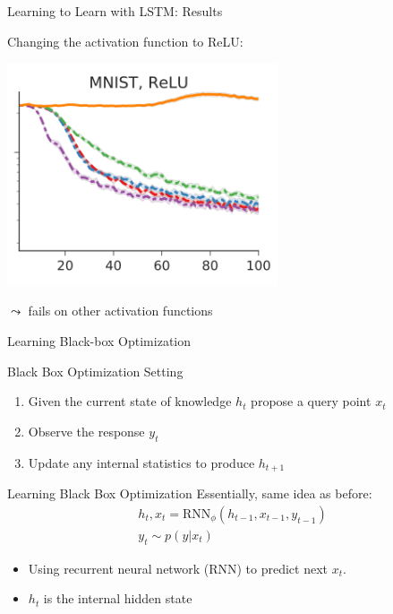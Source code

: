 \begin{frame}[c]{Learning to Learn with LSTM: Results\newline {}}

Changing the activation function to ReLU:
\smallskip

\centering
\includegraphics[width=0.6\textwidth]{images/l2l_mnist_relu}

$\leadsto$ fails on other activation functions

\end{frame}
\begin{frame}[c]{Learning Black-box Optimization~}

\begin{block}{Black Box Optimization Setting}
\begin{enumerate}
  \item Given the current state of knowledge $h_t$ propose a query point $x_t$
  \item Observe the response $y_t$
  \item Update any internal statistics to produce $h_{t+1}$
\end{enumerate}
\end{block}

\pause

\begin{block}{Learning Black Box Optimization}
Essentially, same idea as before:
\begin{eqnarray}
h_t, x_t = \text{RNN}_\phi(h_{t-1}, x_{t-1}, y_{t-1}) \nonumber \\
y_t \sim p(y|x_t)\nonumber
\end{eqnarray}

\begin{itemize}
  \item Using recurrent neural network (RNN) to predict next $x_t$.
  \item $h_t$ is the internal hidden state 
\end{itemize}

\end{block}



\end{frame}
